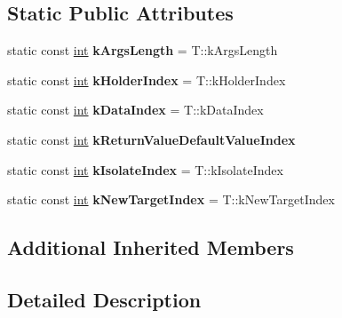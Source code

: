 \subsection*{Static Public Attributes}
\begin{DoxyCompactItemize}
\item 
\mbox{\label{classv8_1_1internal_1_1FunctionCallbackArguments_a418aef384caf837dd281952afb2ae5a7}} 
static const \mbox{\hyperlink{classint}{int}} {\bfseries k\+Args\+Length} = T\+::k\+Args\+Length
\item 
\mbox{\label{classv8_1_1internal_1_1FunctionCallbackArguments_a1b198f7e951f79e969f19a627250bc8f}} 
static const \mbox{\hyperlink{classint}{int}} {\bfseries k\+Holder\+Index} = T\+::k\+Holder\+Index
\item 
\mbox{\label{classv8_1_1internal_1_1FunctionCallbackArguments_a128ce8dd01b7536c09ac8424f656a627}} 
static const \mbox{\hyperlink{classint}{int}} {\bfseries k\+Data\+Index} = T\+::k\+Data\+Index
\item 
static const \mbox{\hyperlink{classint}{int}} {\bfseries k\+Return\+Value\+Default\+Value\+Index}
\item 
\mbox{\label{classv8_1_1internal_1_1FunctionCallbackArguments_a1381736593fe4d9bf415e577662ac8d9}} 
static const \mbox{\hyperlink{classint}{int}} {\bfseries k\+Isolate\+Index} = T\+::k\+Isolate\+Index
\item 
\mbox{\label{classv8_1_1internal_1_1FunctionCallbackArguments_a68cfc624ddc5d17b087c623a1d4c649e}} 
static const \mbox{\hyperlink{classint}{int}} {\bfseries k\+New\+Target\+Index} = T\+::k\+New\+Target\+Index
\end{DoxyCompactItemize}
\subsection*{Additional Inherited Members}


\subsection{Detailed Description}


